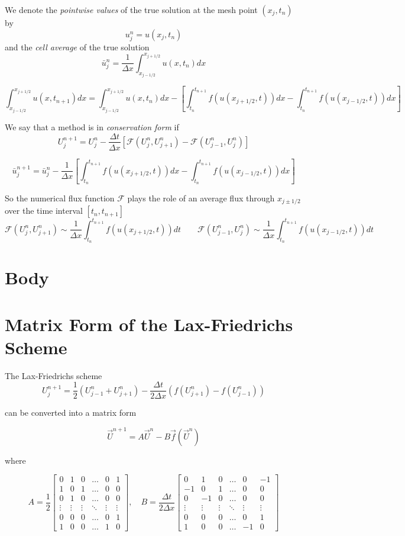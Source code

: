 \documentclass{myproject}
\begin{document}
We denote the \emph{pointwise values} of the true solution at the mesh point $(x_j, t_n)$ by 
\[
    u_j^n = u(x_j,t_n)
\]
and the \emph{cell average} of the true solution 
\[
    \bar{u}_j^n = \frac{1}{\Delta x} \int_{x_{j-1/2}}^{x_{j+1/2}} u(x,t_n) dx
\]

\[
    \int_{x_{j-1/2}}^{x_{j+1/2}} u(x,t_{n+1}) dx = \int_{x_{j-1/2}}^{x_{j+1/2}} u(x,t_{n}) dx - \left[ \int_{t_n}^{t_{n+1}} f(u(x_{j+1/2},t)) dx - \int_{t_n}^{t_{n+1}} f(u(x_{j-1/2},t)) dx \right]
\]

We say that a method is in \emph{conservation form} if 
\[
    U_j^{n+1} = U_j^n - \frac{\Delta t}{\Delta x} \left[ \mathcal{F}(U_{j}^{n}, U_{j+1}^{n}) - \mathcal{F}(U_{j-1}^{n}, U_{j}^{n}) \right]
\]

\[
    \bar{u}_j^{n+1} = \bar{u}_j^n - \frac{1}{\Delta x}\left[ \int_{t_n}^{t_{n+1}} f(u(x_{j+1/2},t)) dx - \int_{t_n}^{t_{n+1}} f(u(x_{j-1/2},t)) dx \right]
\]

So the numerical flux function $\mathcal{F}$ plays the role of an average flux through $x_{j\pm1/2}$ over the time interval $[t_n, t_{n+1}]$
\[
    \mathcal{F}(U_j^n, U_{j+1}^n) \sim \frac{1}{\Delta x} \int_{t_n}^{t_{n+1}} f(u(x_{j+1/2}, t)) dt \qquad \mathcal{F}(U_{j-1}^n, U_{j}^n) \sim \frac{1}{\Delta x} \int_{t_n}^{t_{n+1}} f(u(x_{j-1/2}, t)) dt
\]

\section{Body}

\section{Matrix Form of the Lax-Friedrichs Scheme}
The Lax-Friedrichs scheme
\[
    U_j^{n+1} = \frac{1}{2}\left( U_{j-1}^{n} + U_{j+1}^{n} \right) - \frac{\Delta t}{2\Delta x}\left( f(U_{j+1}^{n}) - f(U_{j-1}^{n}) \right)
\]

can be converted into a matrix form

\[
\vec{U}^{n+1} = A\vec{U}^{n} - B\vec{f}(\vec{U}^{n})
\]

where

\[
A = \frac{1}{2}
\begin{bmatrix}
0 & 1 & 0 & \dots & 0 & 1 \\
1 & 0 & 1 & \dots & 0 & 0 \\
0 & 1 & 0 & \dots & 0 & 0 \\
\vdots & \vdots & \vdots & \ddots & \vdots & \vdots \\
0 & 0 & 0 & \dots & 0 & 1 \\
1 & 0 & 0 & \dots & 1 & 0
\end{bmatrix},
\quad
B = \frac{\Delta t}{2 \Delta x}
\begin{bmatrix}
0 & 1 & 0 & \dots & 0 & -1 \\
-1 & 0 & 1 & \dots & 0 & 0 \\
0 & -1 & 0 & \dots & 0 & 0 \\
\vdots & \vdots & \vdots & \ddots & \vdots & \vdots \\
0 & 0 & 0 & \dots & 0 & 1 \\
1 & 0 & 0 & \dots & -1 & 0
\end{bmatrix}
\]
\end{document}

